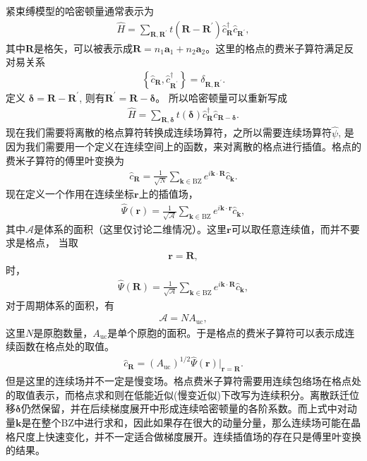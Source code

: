 \documentclass[10pt, oneside]{article}
\newcommand{\pr}{\prime}
\begin{document}
紧束缚模型的哈密顿量通常表示为
\begin{align}
    \hat{H} = \sum_{\bm{R},\bm{R}^{\prime}} t \left(\bm{R}- \bm{R}^{\prime}\right) \hat{c}^{\dagger}_{\bm{R}} \hat{c}_{\bm{R}^{\prime}},
\end{align}
其中\(\bm{R}\)是格矢，可以被表示成\(\bm{R} = n_1 \bm{a}_{1} + n_2 \bm{a}_{2}\)。这里的格点的费米子算符满足反对易关系
\begin{align}
	\left\{\hat{c}_{\bm{R}}, \hat{c}^{\dagger}_{\bm{R}^{\prime}}\right\} = \delta_{\bm{R}, \bm{R}^{\prime}}.
\end{align}
定义 \(\bm{\delta} = \bm{R} - \bm{R}^{\pr}\), 则有\(\bm{R}^{\prime} = \bm{R} - \bm{\delta}\)。 所以哈密顿量可以重新写成
\begin{align}
	\hat{H} = \sum_{\bm{R}, \bm{\delta}} t \left(\bm{\delta}\right) \hat{c}^{\dagger}_{\bm{R}} \hat{c}_{\bm{R} - \bm{\delta}}. 
\end{align} 
现在我们需要将离散的格点算符转换成连续场算符，之所以需要连续场算符\(\hat{\psi}\), 是因为我们需要用一个定义在连续空间上的函数，来对离散的格点进行插值。格点的费米子算符的傅里叶变换为
\begin{align}
	\hat{c}_{\bm{R}} = \frac{1}{\sqrt{N}} \sum_{\bm{k} \in \mathrm{BZ}} e^{i \bm{k} \cdot \bm{R}} \hat{c}_{\bm{k}}.
\end{align}
现在定义一个作用在连续坐标\(\bm{r}\)上的插值场，
\begin{align}
	\hat{\Psi} \left(\bm{r}\right) = \frac{1}{\sqrt{\mathcal{A}}} \sum_{\bm{k} \in \mathrm{BZ}} e^{i \bm{k} \cdot \bm{r}} \hat{c}_{\bm{k}},
\end{align}
其中\(\mathcal{A}\)是体系的面积（这里仅讨论二维情况）。这里\(\bm{r}\)可以取任意连续值，而并不要求是格点，
当取
\begin{align}
	\bm{r} = \bm{R},
\end{align}
时， 
\begin{align}
	\hat{\Psi} \left(\bm{R}\right) = \frac{1}{\sqrt{\mathcal{A}}} \sum_{\bm{k} \in \mathrm{BZ}} e^{i \bm{k} \cdot \bm{R}} \hat{c}_{\bm{k}},
\end{align}
对于周期体系的面积，有
\begin{align}
	\mathcal{A} = N A_{\mathrm{uc}},
\end{align}
这里\(N\)是原胞数量，\(A_{\mathrm{uc}}\)是单个原胞的面积。于是格点的费米子算符可以表示成连续函数在格点处的取值。
\begin{align}
	\boxed{
		\hat{c}_{\bm{R}} = \left(A_{\mathrm{uc}}\right)^{1/2} \hat{\Psi} \left(\bm{r}\right) \bigg|_{\bm{r} = \bm{R}}. 
	}
\end{align}
但是这里的连续场并不一定是慢变场。格点费米子算符需要用连续包络场在格点处的取值表示，而格点求和则在低能近似(慢变近似)下改写为连续积分。离散跃迁位移\(\bm{\delta}\)仍然保留，并在后续梯度展开中形成连续哈密顿量的各阶系数。而上式中对动量\(\bm{k}\)是在整个BZ中进行求和，因此如果存在很大的动量分量，那么连续场可能在晶格尺度上快速变化，并不一定适合做梯度展开。连续插值场的存在只是傅里叶变换的结果。
\end{document}
